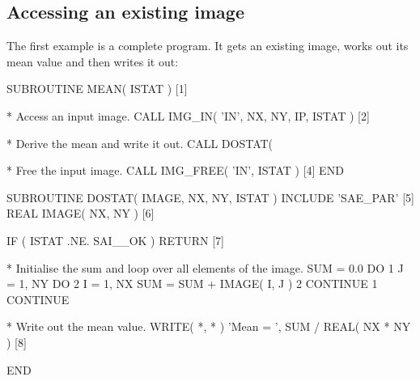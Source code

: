 \documentclass[twoside,11pt,nolof]{starlink}
\newenvironment{code}{\begin{small}}
                     {\end{small}}
\begin{document}
\subsection{Accessing \label{IMGMEAN}an existing image}
The first example is a complete program. It gets an existing image,
works out its mean value and then writes it out:
\begin{code}
\begin{terminalv}
      SUBROUTINE MEAN( ISTAT )                                [1]

*  Access an input image.
      CALL IMG_IN( 'IN', NX, NY, IP, ISTAT )                  [2]

*  Derive the mean and write it out.
      CALL DOSTAT( %

*  Free the input image.
      CALL IMG_FREE( 'IN', ISTAT )                            [4]
      END

      SUBROUTINE DOSTAT( IMAGE, NX, NY, ISTAT )
      INCLUDE 'SAE_PAR'                                       [5]
      REAL IMAGE( NX, NY )                                    [6]

      IF ( ISTAT .NE. SAI__OK ) RETURN                        [7]

*  Initialise the sum and loop over all elements of the image.
      SUM = 0.0
      DO 1 J = 1, NY
         DO 2 I = 1, NX
            SUM = SUM + IMAGE( I, J )
 2       CONTINUE
 1    CONTINUE

*  Write out the mean value.
      WRITE( *, * ) 'Mean = ', SUM / REAL( NX * NY )          [8]

      END
\end{terminalv}
\end{code}
\end{document}
